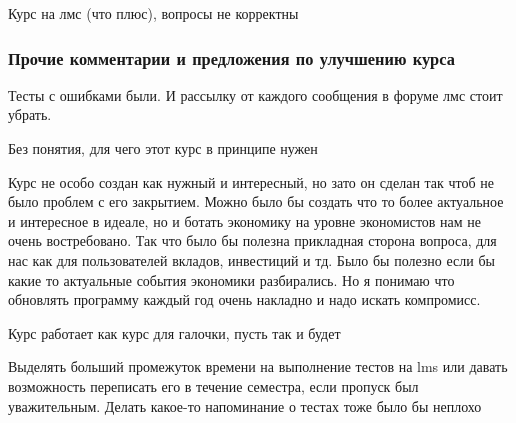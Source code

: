             \begin{commentbox} 
                Курс на лмс (что плюс), вопросы не корректны 
            \end{commentbox} 
        
    
    \subsubsection{Прочие комментарии и предложения по улучшению курса}
        \begin{commentbox}
            Тесты с ошибками были. И рассылку от каждого сообщения в форуме лмс стоит убрать. 
        \end{commentbox}

        \begin{commentbox}
            Без понятия, для чего этот курс в принципе нужен
        \end{commentbox}

        \begin{commentbox}
            Курс не особо создан как нужный и интересный, но зато он сделан так чтоб не было проблем с его закрытием. Можно было бы создать что то более актуальное и интересное в идеале, но и ботать экономику на уровне экономистов нам не очень востребовано. Так что было бы полезна прикладная сторона вопроса, для нас как для пользователей вкладов, инвестиций и тд. Было бы полезно если бы какие то актуальные события экономики разбирались. Но я понимаю что обновлять программу каждый год очень накладно и надо искать компромисс.
        \end{commentbox}

        \begin{commentbox}
            Курс работает как курс для галочки, пусть так и будет
        \end{commentbox}

        \begin{commentbox}
            Выделять больший промежуток времени на выполнение тестов на lms или давать возможность переписать его в течение семестра, если пропуск был уважительным. Делать какое-то напоминание о тестах тоже было бы неплохо 
        \end{commentbox}